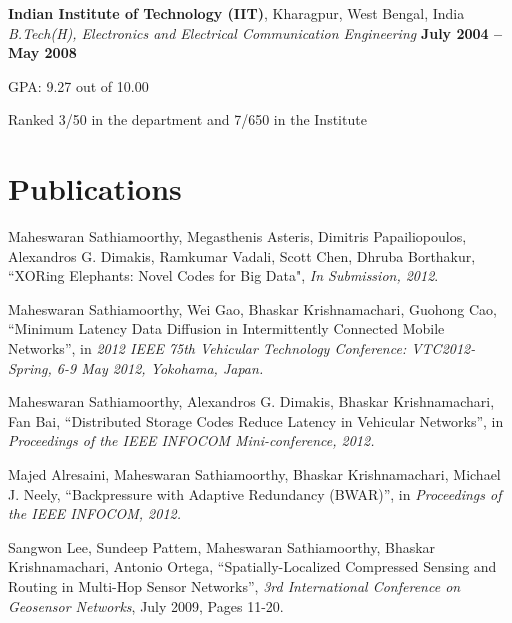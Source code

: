 \documentclass[margin,line]{resume}
\begin{document}
\begin{resume}
    
    \textbf{Indian Institute of Technology (IIT)}, Kharagpur, West Bengal, India \\%
    \textsl{B.Tech(H), Electronics and Electrical Communication Engineering} \hfill \textbf{ July 2004 -- May 2008}\vspace{-3mm}\\\vspace{-1mm}%
    \begin{list2}
    		\item GPA:	9.27 out of 10.00
    		\item Ranked 3/50 in the department and 7/650 in the Institute        
    \end{list2}\vspace{-1.5mm}%


\section{\mysidestyle Publications}
\begin{list2}
   \item Maheswaran Sathiamoorthy, 
             Megasthenis Asteris,
             Dimitris Papailiopoulos,
             Alexandros G. Dimakis,
             Ramkumar Vadali,
             Scott Chen,
             Dhruba Borthakur, ``XORing Elephants: Novel Codes for Big Data", \textsl{In Submission, 2012}.
    \item Maheswaran Sathiamoorthy, Wei Gao, Bhaskar Krishnamachari, Guohong Cao,
    ``Minimum Latency Data Diffusion in Intermittently Connected Mobile Networks'', in
    \textsl{2012 IEEE 75th Vehicular Technology Conference: VTC2012-Spring, 6-9 May 2012, Yokohama, Japan.}
    \item Maheswaran Sathiamoorthy, Alexandros G. Dimakis, Bhaskar Krishnamachari, Fan Bai, 
    ``Distributed Storage Codes Reduce Latency in Vehicular Networks'', in
    \textsl{Proceedings of the IEEE INFOCOM Mini-conference, 2012.}
    \item Majed Alresaini, Maheswaran Sathiamoorthy, Bhaskar Krishnamachari, Michael J. Neely, ``Backpressure with Adaptive Redundancy (BWAR)'', 
    in \textsl{Proceedings of the IEEE INFOCOM, 2012.}
    \item Sangwon Lee, Sundeep Pattem, Maheswaran Sathiamoorthy, Bhaskar Krishnamachari, Antonio Ortega, ``Spatially-Localized Compressed Sensing and Routing in Multi-Hop Sensor Networks'', \textsl{3rd International Conference on Geosensor Networks}, July 2009, Pages 11-20.  
    \end{list2}


\end{resume}
\end{document}
